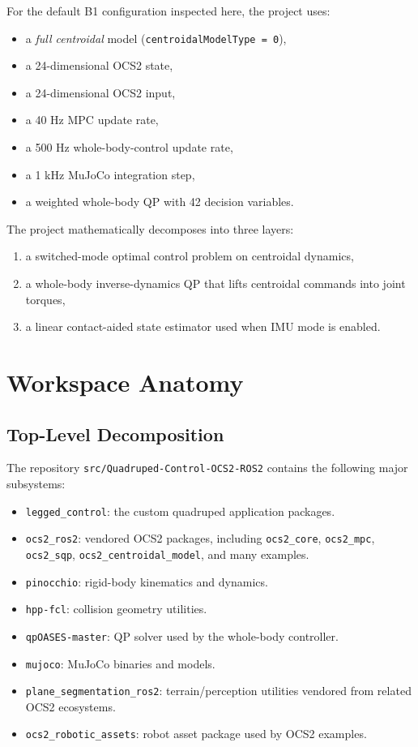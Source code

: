 \documentclass[11pt,a4paper]{article}
\newcommand{\code}[1]{\texttt{#1}}
\begin{document}
For the default B1 configuration inspected here, the project uses:
\begin{itemize}[leftmargin=*]
\item a \emph{full centroidal} model (\code{centroidalModelType = 0}),
\item a 24-dimensional OCS2 state,
\item a 24-dimensional OCS2 input,
\item a 40 Hz MPC update rate,
\item a 500 Hz whole-body-control update rate,
\item a 1 kHz MuJoCo integration step,
\item a weighted whole-body QP with 42 decision variables.
\end{itemize}

The project mathematically decomposes into three layers:
\begin{enumerate}[leftmargin=*]
\item a switched-mode optimal control problem on centroidal dynamics,
\item a whole-body inverse-dynamics QP that lifts centroidal commands into joint torques,
\item a linear contact-aided state estimator used when IMU mode is enabled.
\end{enumerate}

\section{Workspace Anatomy}
\subsection{Top-Level Decomposition}
The repository \code{src/Quadruped-Control-OCS2-ROS2} contains the following major subsystems:
\begin{itemize}[leftmargin=*]
\item \code{legged_control}: the custom quadruped application packages.
\item \code{ocs2_ros2}: vendored OCS2 packages, including \code{ocs2_core}, \code{ocs2_mpc}, \code{ocs2_sqp}, \code{ocs2_centroidal_model}, and many examples.
\item \code{pinocchio}: rigid-body kinematics and dynamics.
\item \code{hpp-fcl}: collision geometry utilities.
\item \code{qpOASES-master}: QP solver used by the whole-body controller.
\item \code{mujoco}: MuJoCo binaries and models.
\item \code{plane_segmentation_ros2}: terrain/perception utilities vendored from related OCS2 ecosystems.
\item \code{ocs2_robotic_assets}: robot asset package used by OCS2 examples.
\end{itemize}
\end{document}
